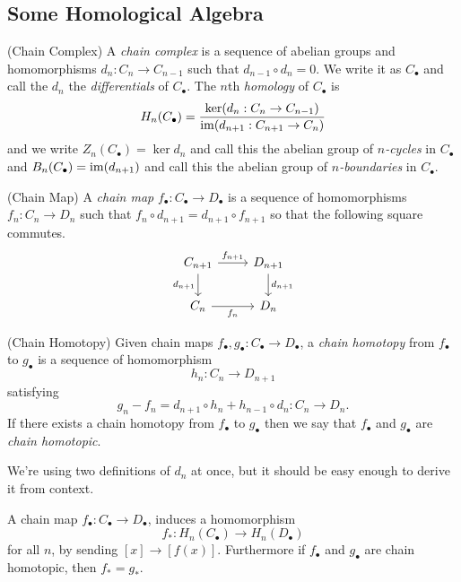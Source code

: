 \documentclass{article}
\begin{document}
\subsection{Some Homological Algebra}
\begin{definition}
	(Chain Complex) A \textit{chain complex} is a sequence of abelian groups and homomorphisms $ d_n: C_n \to C_{n-1} $ such that $ d_{n-1} \circ d_n = 0 $. We write it as $ C_\bullet $ and call the $ d_n $ the \textit{differentials} of $ C_\bullet $. The $ n $th \textit{homology} of $ C_\bullet $ is
	\[
		H_n(C_\bullet) = \frac{\ker (d_n: C_n \to C_{n-1})}{\operatorname{im}( d_{n+1}: C_{n+1} \to C_n)}
	\]
	and we write $ Z_n(C_\bullet) = \ker d_n $ and call this the abelian group of $ n $\textit{-cycles} in $ C_\bullet $ and $ B_n(C_\bullet) = \operatorname{im}(d_{n+1}) $ and call this the abelian group of $ n $\textit{-boundaries} in $ C_\bullet $.
\end{definition}
\begin{definition}
	(Chain Map) A \textit{chain map} $ f_\bullet: C_\bullet \to D_\bullet $ is a sequence of homomorphisms $ f_n:C_n \to D_n $ such that $ f_n \circ d_{n+1} = d_{n+1} \circ f_{n+1} $ so that the following square commutes.
	\[
\begin{tikzcd}
C_{n+1} \arrow[r, "f_{n+1}"] \arrow[d, "d_{n+1}"'] & D_{n+1} \arrow[d, "d_{n+1}"] \\
C_n \arrow[r, "f_n"'] & D_n
\end{tikzcd}
\]
\end{definition}
\begin{definition}
	(Chain Homotopy) Given chain maps $ f_\bullet,g_\bullet:C_\bullet \to D_\bullet $, a \textit{chain homotopy} from $ f_\bullet $ to $ g_\bullet $ is a sequence of homomorphism
	\[
		h_n : C_n \to D_{n+1}
	\]
	satisfying 
	\[
		g_n - f_n = d_{n+1} \circ h_n + h_{n-1} \circ d_n: C_n \to D_n.
	\]
	If there exists a chain homotopy from $ f_\bullet $ to $ g_\bullet $ then we say that $ f_\bullet $ and $ g_\bullet $ are \textit{chain homotopic}.
\end{definition}
\begin{remark}
  We're using two definitions of $ d_n $ at once, but it should be easy enough to derive it from context.
\end{remark}
\begin{lemma}
  A chain map $ f_\bullet: C_\bullet \to D_\bullet $, induces a homomorphism
  \[
    f_*: H_n(C_\bullet) \to H_n(D_\bullet)
  \]
  for all $ n $, by sending $ [x] \to [f(x)] $. Furthermore if $ f_\bullet $ and $ g_\bullet $ are chain homotopic, then $ f_* = g_* $.
\end{lemma}
\end{document}
